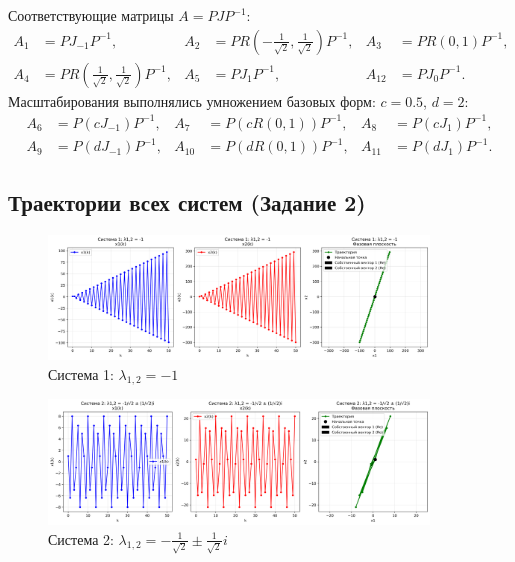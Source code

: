 \noindent Соответствующие матрицы $A = PJP^{-1}$:
\begin{align}
A_1 &= P J_{-1} P^{-1}, & A_2 &= P R\!\left(-\tfrac{1}{\sqrt{2}},\tfrac{1}{\sqrt{2}}\right) P^{-1}, & A_3 &= P R(0,1) P^{-1}, \\
A_4 &= P R\!\left(\tfrac{1}{\sqrt{2}},\tfrac{1}{\sqrt{2}}\right) P^{-1}, & A_5 &= P J_{1} P^{-1}, & A_{12} &= P J_{0} P^{-1}.
\end{align}
Масштабирования выполнялись умножением базовых форм: $c=0.5$, $d=2$:
\begin{align}
A_6 &= P (c J_{-1}) P^{-1}, & A_7 &= P (c R(0,1)) P^{-1}, & A_8 &= P (c J_{1}) P^{-1}, \\
A_9 &= P (d J_{-1}) P^{-1}, & A_{10} &= P (d R(0,1)) P^{-1}, & A_{11} &= P (d J_{1}) P^{-1}.
\end{align}

\subsection*{Траектории всех систем (Задание 2)}

\begin{figure}[H]
    \centering
    \includegraphics[width=0.9\textwidth]{images/task2/system1_lambda_minus1.png}
    \caption{Система 1: $\lambda_{1,2} = -1$}
\end{figure}

\begin{figure}[H]
    \centering
    \includegraphics[width=0.9\textwidth]{images/task2/system2_lambda_complex_stable.png}
    \caption{Система 2: $\lambda_{1,2} = -\tfrac{1}{\sqrt{2}} \pm \tfrac{1}{\sqrt{2}}i$}
\end{figure}

